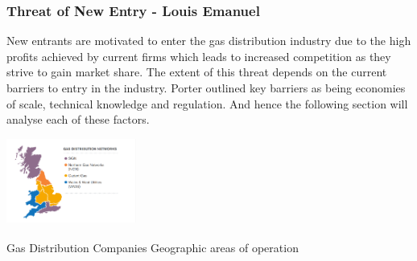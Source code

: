 \documentclass[11pt]{article}		%
\newcommand{\supercite}[1]{\textsuperscript{\cite{#1}}}		%
\begin{document}
			
		\subsubsection[Threat of New Entry]{Threat of New Entry - Louis Emanuel}
				New entrants are motivated to enter the gas distribution industry due to the high profits achieved by current firms which leads to increased competition as they strive to gain market share. The extent of this threat depends on the current barriers to entry in the industry. Porter outlined key barriers as being economies of scale, technical knowledge and regulation. And hence the following section will analyse each of these factors.
				
				\begin{floatingfigure}[r]{0.35\textwidth}
				    \centering
			    	\includegraphics[width=0.32\textwidth]{distribution}
				    \caption{Gas Distribution Companies Geographic areas of operation\supercite{sönnichsen_5_2021}}
		    	\label{distrit}
	        	\end{floatingfigure}
	        	
\end{document}
